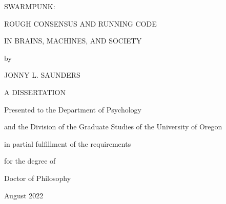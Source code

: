 \begin{titlepage}
\begin{centering}

SWARMPUNK:

ROUGH CONSENSUS AND RUNNING CODE

IN BRAINS, MACHINES, AND SOCIETY

\vspace{3in}

by

JONNY L. SAUNDERS

\vspace{2in}

A DISSERTATION

Presented to the Department of Psychology

and the Division of the Graduate Studies of the University of Oregon

in partial fulfillment of the requirements

for the degree of

Doctor of Philosophy

August 2022

\end{centering}
\end{titlepage}